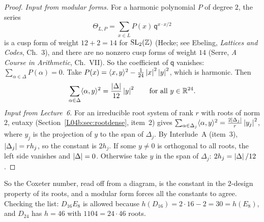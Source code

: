 \begin{proof}
\emph{Input from modular forms.} For a harmonic polynomial $P$ of degree $2$, the series
\[
  \Theta_{L,P}=\sum_{x\in L}P(x)\,\mathsf q^{x\cdot x/2}
\]
is a cusp form of weight $12+2=14$ for $\mathrm{SL}_2(\mathbb{Z})$ (Hecke; see Ebeling, \emph{Lattices and Codes},
Ch.~3), and there are no nonzero cusp forms of weight $14$ (Serre, \emph{A Course in Arithmetic},
Ch.~VII). So the coefficient of $\mathsf q$ vanishes: $\sum_{\alpha\in\Delta}P(\alpha)=0$. Take $P(x)=\langle x, y\rangle^2-\frac{1}{24}\left\lvert x \right\rvert^2\left\lvert y \right\rvert^2$, which is harmonic. Then
\[
  \sum_{\alpha\in\Delta}\langle \alpha, y\rangle^2=\frac{\left\lvert \Delta \right\rvert}{12}\left\lvert y \right\rvert^2\qquad\text{for all }y\in\mathbb{R}^{24}.
\]
\emph{Input from Lecture~6.} For an irreducible root system of rank $r$ with roots of norm $2$, eutaxy
(Section~\ref{L04b:sec:rootdense}, item~2) gives $\sum_{\alpha\in\Delta_j}\langle \alpha, y\rangle^2=\frac{2\left\lvert \Delta_j \right\rvert}{r}\left\lvert y_j \right\rvert^2$,
where $y_j$ is the projection of $y$ to the span of $\Delta_j$. By Interlude~A (item~3),
$\left\lvert \Delta_j \right\rvert=rh_j$, so the constant is $2h_j$. If some $y\ne0$ is orthogonal to all roots, the left
side vanishes and $\left\lvert \Delta \right\rvert=0$. Otherwise take $y$ in the span of $\Delta_j$: $2h_j=\left\lvert \Delta \right\rvert/12$.
\end{proof}

So the Coxeter number, read off from a diagram, is the constant in the $2$-design property of its roots,
and a modular form forces all the constants to agree. Checking the list: $D_{16}E_8$ is allowed because
$h(D_{16})=2\cdot16-2=30=h(E_8)$, and $D_{24}$ has $h=46$ with $1104=24\cdot46$ roots.

